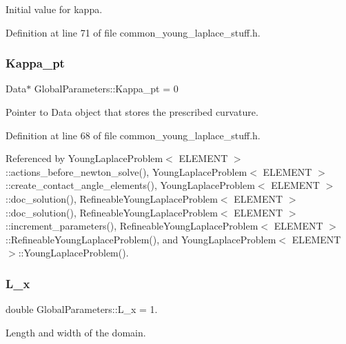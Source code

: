 Initial value for kappa. 



Definition at line 71 of file common\+\_\+young\+\_\+laplace\+\_\+stuff.\+h.

\mbox{\label{namespaceGlobalParameters_ac6234184cce40ab2c6bec92b37e4ae41}} 
\subsubsection{\texorpdfstring{Kappa\+\_\+pt}{Kappa\_pt}}
{\footnotesize\ttfamily Data$\ast$ Global\+Parameters\+::\+Kappa\+\_\+pt = 0}



Pointer to Data object that stores the prescribed curvature. 



Definition at line 68 of file common\+\_\+young\+\_\+laplace\+\_\+stuff.\+h.



Referenced by Young\+Laplace\+Problem$<$ E\+L\+E\+M\+E\+N\+T $>$\+::actions\+\_\+before\+\_\+newton\+\_\+solve(), Young\+Laplace\+Problem$<$ E\+L\+E\+M\+E\+N\+T $>$\+::create\+\_\+contact\+\_\+angle\+\_\+elements(), Young\+Laplace\+Problem$<$ E\+L\+E\+M\+E\+N\+T $>$\+::doc\+\_\+solution(), Refineable\+Young\+Laplace\+Problem$<$ E\+L\+E\+M\+E\+N\+T $>$\+::doc\+\_\+solution(), Refineable\+Young\+Laplace\+Problem$<$ E\+L\+E\+M\+E\+N\+T $>$\+::increment\+\_\+parameters(), Refineable\+Young\+Laplace\+Problem$<$ E\+L\+E\+M\+E\+N\+T $>$\+::\+Refineable\+Young\+Laplace\+Problem(), and Young\+Laplace\+Problem$<$ E\+L\+E\+M\+E\+N\+T $>$\+::\+Young\+Laplace\+Problem().

\mbox{\label{namespaceGlobalParameters_a36ebf514fdd1e78fff69907b39e25af6}} 
\subsubsection{\texorpdfstring{L\+\_\+x}{L\_x}}
{\footnotesize\ttfamily double Global\+Parameters\+::\+L\+\_\+x = 1.}



Length and width of the domain. 

